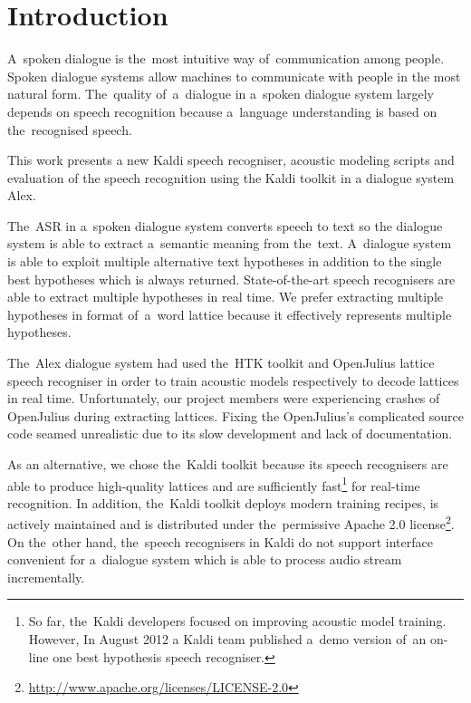 \chapter{Introduction}
\label{cha:intro}

A~spoken dialogue is the~most intuitive way of~communication among people. 
Spoken dialogue systems allow machines to communicate with people in the most natural form.
The~quality of~a~dialogue in a~spoken dialogue system largely depends on speech recognition because a~language understanding is based on the~recognised speech. 

This work presents a new Kaldi speech recogniser, acoustic modeling scripts and evaluation of the speech recognition using the Kaldi toolkit \cite{povey2011kaldi} in a dialogue system Alex\cite{ptics2014url}.

The~\acf{ASR} in a~spoken dialogue system converts speech to text so the dialogue system is able to extract a~semantic meaning from the~text.
A~dialogue system is able to exploit multiple alternative text hypotheses in addition to the single best hypotheses which is always returned. 
State-of-the-art speech recognisers are able to extract multiple hypotheses in real time.
We prefer extracting multiple hypotheses in format of~a~word lattice because it effectively represents multiple hypotheses.

The~Alex dialogue system had used the~\ac{HTK} toolkit\cite{young94htk} and OpenJulius\cite{lee2009julius} lattice speech recogniser in order to train acoustic models respectively to decode lattices in real time. 
Unfortunately, our project members were experiencing crashes of OpenJulius during extracting lattices.
Fixing the OpenJulius's complicated source code seamed unrealistic due to its slow development and lack of documentation.

As an alternative, we chose the~Kaldi toolkit because its speech recognisers are able to produce high-quality lattices and are sufficiently fast\footnote{So far, 
    the~Kaldi developers focused on improving acoustic model training. 
    However, In August 2012 a Kaldi team published a~demo version of~an on-line one best hypothesis speech recogniser.} 
for real-time recognition.\cite{povey2012generating}
In addition, the~Kaldi toolkit deploys modern training recipes, is actively maintained and is distributed under the~permissive Apache 2.0 license\footnote{\url{http://www.apache.org/licenses/LICENSE-2.0}}.
On the~other hand, the~speech recognisers in Kaldi do not support interface convenient for a~dialogue system which is able to process audio stream incrementally.

